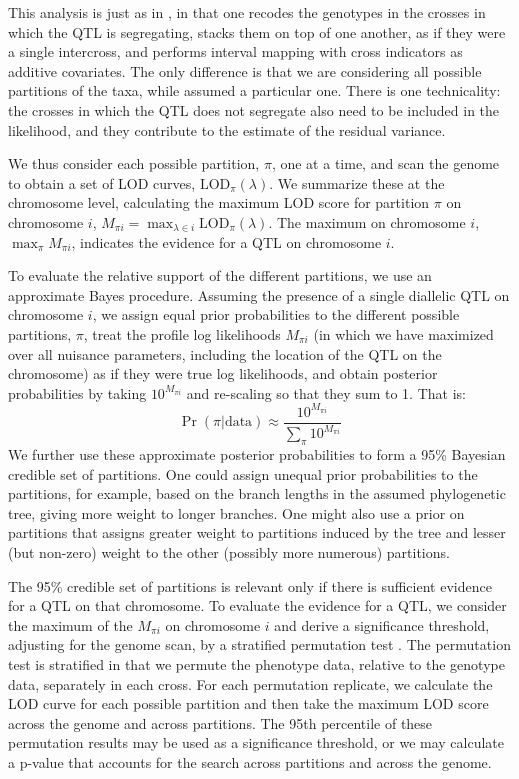 \documentclass[12pt,letterpaper]{article}
\newcommand{\LOD}{\text{LOD}}
\begin{document}
This analysis is just as in \citet{Li2005}, in that one recodes the
genotypes in the crosses in which the QTL is segregating, stacks them
on top of one another, as if they were a single intercross, and performs interval mapping
with cross indicators as additive covariates.  The only 
difference is that we are considering all possible partitions of the
taxa, while \citet{Li2005} assumed a particular one.  
There is one
technicality: the crosses in which the QTL does not segregate also
need to be included in the likelihood, and they contribute to the
estimate of the residual variance.  

We thus consider each possible partition, $\pi$, one at a time, and
scan the genome to obtain a set of LOD curves, $\LOD_\pi(\lambda)$.
We summarize these at the chromosome level, calculating the maximum LOD
score for partition $\pi$ on chromosome $i$, $M_{\pi i} =
\max_{\lambda \in i} \LOD_\pi(\lambda)$.  The maximum on chromosome
$i$, $\max_\pi M_{\pi i}$, indicates the evidence for a QTL on
chromosome $i$.  

To evaluate the relative support of the different partitions, we use
an approximate Bayes procedure.  Assuming the
presence of a single diallelic QTL on chromosome $i$, we assign equal prior
probabilities to the different possible partitions, $\pi$, treat
the profile log likelihoods $M_{\pi i}$ (in which we have maximized over
all nuisance parameters, including the location of the QTL on the
chromosome) as if they were true log likelihoods, and obtain posterior
probabilities by taking $10^{M_{\pi i}}$ and re-scaling so that they
sum to 1.  That is:
$$\Pr(\pi | \text{data}) \approx \frac{10^{M_{\pi i}}}{\sum_\pi
  10^{M_{\pi i}}}$$
We further use these approximate posterior probabilities to form a
95\% Bayesian credible set of partitions.
One could assign
unequal prior probabilities to the partitions, for example, based on
the branch lengths in the assumed phylogenetic tree, giving more
weight to longer branches.  One
might also use a prior on partitions that assigns greater weight to
partitions induced by the tree and lesser (but non-zero) weight to the
other (possibly more numerous) partitions.

The 95\% credible set of partitions is relevant only if there is
sufficient evidence for a QTL on that chromosome.  To evaluate the
evidence for a QTL, we consider the maximum of the $M_{\pi i}$ on
chromosome $i$ and derive a significance threshold, adjusting for the
genome scan, by a stratified permutation test \citep{Churchill1994}.  
The permutation test is stratified in that we permute the phenotype data, relative to the
genotype data, separately in each cross.  For each permutation
replicate, we calculate the LOD curve for each possible partition and
then take the maximum LOD score across the genome and across
partitions.  The 95th percentile of these permutation results may be
used as a significance threshold, or we may calculate a p-value that
accounts for the search across partitions and across the genome.
\end{document}
